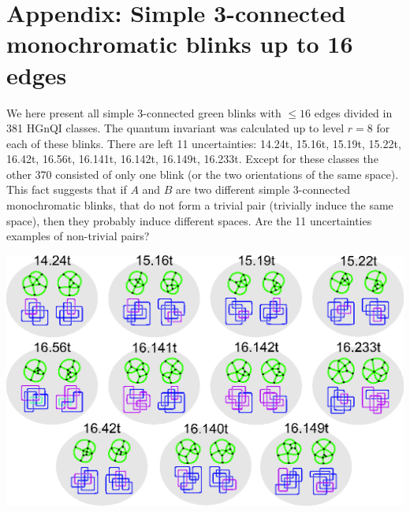 \section{Appendix: Simple 3-connected monochromatic blinks up to 16 edges}
\label{chap:catalolgue3con}

We here present all simple 3-connected green blinks with
$\leq 16$ edges divided in 381 HGnQI classes. The quantum
invariant was calculated up to level $r=8$ for each of
these blinks. There are left 11 uncertainties: 14.24t,
15.16t, 15.19t, 15.22t, 16.42t, 16.56t, 16.141t, 16.142t,
16.149t, 16.233t. Except for these classes the other 370
consisted of only one blink (or the two orientations of
the same space). This fact suggests that if $A$ and $B$
are two different simple 3-connected monochromatic blinks,
that do not form a trivial pair (trivially induce the
same space), then they probably induce different spaces.
Are the 11 uncertainties examples of non-trivial pairs?

\begin{center}
\includegraphics{A.figs/doubts3connectedisolated.eps}
\end{center}

\setlength{\topmargin}{-1.2cm}

